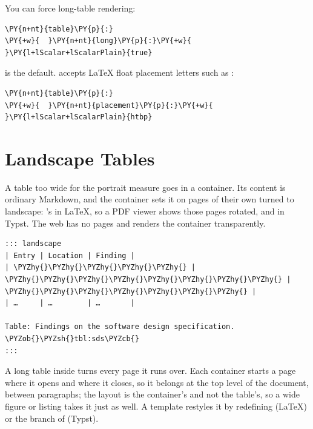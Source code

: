 \documentclass[a4paper,twoside]{article}
\begin{document}
You can force long-table rendering:
\begin{tscode}[lang=yaml, engine=pygments]
\begin{Verbatim}[commandchars=\\\{\},breaklines, breakanywhere, commandchars=\\\{\}]
\PY{n+nt}{table}\PY{p}{:}
\PY{+w}{  }\PY{n+nt}{long}\PY{p}{:}\PY{+w}{ }\PY{l+lScalar+lScalarPlain}{true}
\end{Verbatim}
\end{tscode}
 is the default.  accepts \LaTeX{} float placement
letters such as :
\begin{tscode}[lang=yaml, engine=pygments]
\begin{Verbatim}[commandchars=\\\{\},breaklines, breakanywhere, commandchars=\\\{\}]
\PY{n+nt}{table}\PY{p}{:}
\PY{+w}{  }\PY{n+nt}{placement}\PY{p}{:}\PY{+w}{ }\PY{l+lScalar+lScalarPlain}{htbp}
\end{Verbatim}
\end{tscode}
\section{Landscape Tables}
A table too wide for the portrait measure goes in a 
container. Its content is ordinary Markdown, and the container sets it on
pages of their own turned to landscape: 's  in \LaTeX{},
so a PDF viewer shows those pages rotated, and  in
Typst. The web has no pages and renders the container transparently.
\begin{tscode}[lang=md, engine=pygments]
\begin{Verbatim}[commandchars=\\\{\},breaklines, breakanywhere, commandchars=\\\{\}]
::: landscape
| Entry | Location | Finding |
| \PYZhy{}\PYZhy{}\PYZhy{}\PYZhy{}\PYZhy{} | \PYZhy{}\PYZhy{}\PYZhy{}\PYZhy{}\PYZhy{}\PYZhy{}\PYZhy{}\PYZhy{} | \PYZhy{}\PYZhy{}\PYZhy{}\PYZhy{}\PYZhy{}\PYZhy{}\PYZhy{} |
| …     | …        | …       |

Table: Findings on the software design specification. \PYZob{}\PYZsh{}tbl:sds\PYZcb{}
:::
\end{Verbatim}
\end{tscode}
A long table inside turns every page it runs over. Each container starts a
page where it opens and where it closes, so it belongs at the top level of
the document, between paragraphs; the layout is the container's and not the
table's, so a wide figure or listing takes it just as well. A template
restyles it by redefining  (\LaTeX{}) or the 
branch of  (Typst).
\end{document}
